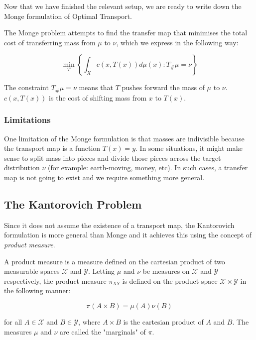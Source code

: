 Now that we have finished the relevant setup, we are ready to write down the Monge formulation of Optimal Transport.

\begin{definition}

The Monge problem attempts to find the transfer map that minimises the total cost of transferring mass from $\mu$ to $\nu$, which we express in the following way:

$$ \min_{T} \left\{ \int_X c(x, T(x)) d\mu(x) : T_{\#} \mu = \nu \right\}$$

The constraint $T_\# \mu = \nu$ means that $T$ pushes forward the mass of $\mu$ to $\nu$. $c(x, T(x))$ is the cost of shifting mass from $x$ to $T(x)$.

\end{definition}

\subsubsection{Limitations}


One limitation of the Monge formulation is that masses are indivisible because the transport map is a function $T(x) = y$. In some situations, it might make sense to split mass into pieces and divide those pieces across the target distribution $\nu$ (for example: earth-moving, money, etc). In such cases, a transfer map is not going to exist and we require something more general.

\subsection{The Kantorovich Problem}

Since it does not assume the existence of a transport map, the Kantorovich formulation is more general than Monge and it achieves this using the concept of \textit{product measure}.

\begin{definition}

A product measure is a measure defined on the cartesian product of two measurable spaces $\mathcal{X}$ and $\mathcal{Y}$. Letting $\mu$ and $\nu$ be measures on $\mathcal{X}$ and $\mathcal{Y}$ respectively, the product measure $\pi_{XY}$ is defined on the product space $\mathcal{X \times Y}$ in the following manner:

$$\pi(A \times B) = \mu(A) \nu(B)$$

for all $A \in \mathcal{X}$ and $B \in \mathcal{Y}$, where $A \times B$ is the cartesian product of $A$ and $B$. The measures $\mu$ and $\nu$ are called the "marginals" of $\pi$.

\end{definition}

